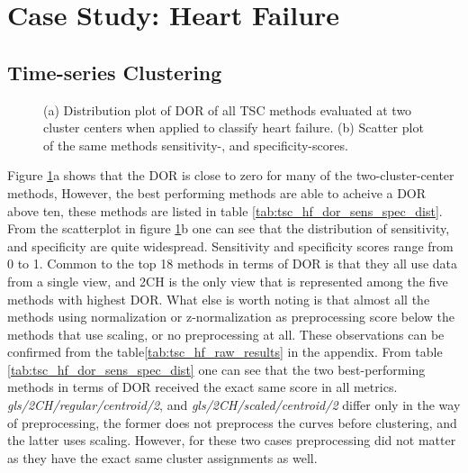 \section{Case Study: Heart Failure}

\subsection{Time-series Clustering}

\begin{figure}[htb]
    \centering
    
    \caption{(a) Distribution plot of DOR of all TSC methods evaluated at two cluster centers when applied to classify heart failure.
             (b) Scatter plot of the same methods sensitivity-, and specificity-scores.}
    \label{fig:tsc_hf_dor_sens_spec_dist}
\end{figure}

Figure \ref{fig:tsc_hf_dor_sens_spec_dist}a shows that the DOR is close to zero for many of the two-cluster-center methods, 
However, the best performing methods are able to acheive a DOR above ten, these methods are listed in table \ref{tab:tsc_hf_dor_sens_spec_dist}.
From the scatterplot in figure \ref{fig:tsc_hf_dor_sens_spec_dist}b one can see that the distribution of sensitivity, and specificity are quite widespread.
Sensitivity and specificity scores range from 0 to 1.
Common to the top 18 methods in terms of DOR is that they all use data from a single view, and 2CH is the only view that is represented among the five methods with highest DOR.
What else is worth noting is that almost all the methods using normalization or z-normalization as preprocessing score below the methods that use scaling, or no preprocessing at all.
These observations can be confirmed from the table\ref{tab:tsc_hf_raw_results} in the appendix. 
From table \ref{tab:tsc_hf_dor_sens_spec_dist} one can see that the two best-performing methods in terms of DOR received the exact same score in all metrics.
\textit{gls/2CH/regular/centroid/2}, and \textit{gls/2CH/scaled/centroid/2} differ only in the way of preprocessing, the former does not preprocess the curves before clustering,
and the latter uses scaling. However, for these two cases preprocessing did not matter as they have the exact same cluster assignments as well.
\bigskip

